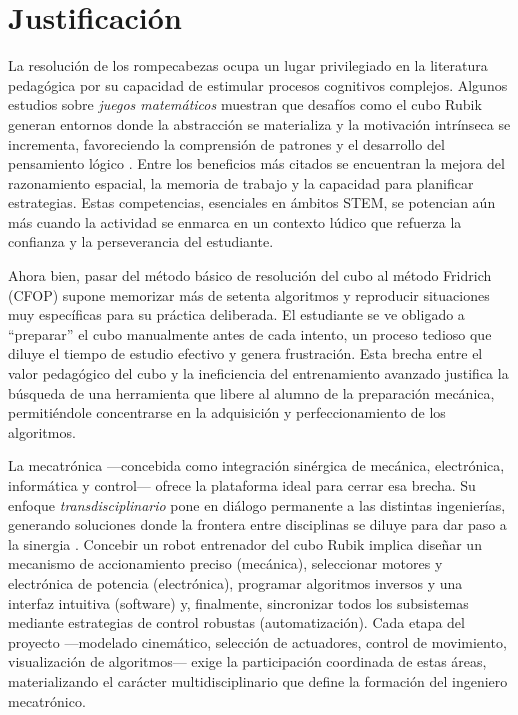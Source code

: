 \section{Justificación}
La resolución de los rompecabezas ocupa un lugar privilegiado en la literatura pedagógica por su capacidad de estimular procesos cognitivos complejos. Algunos estudios sobre \emph{juegos matemáticos} muestran que desafíos como el cubo Rubik generan entornos donde la abstracción se materializa y la motivación intrínseca se incrementa, favoreciendo la comprensión de patrones y el desarrollo del pensamiento lógico \cite{SilvaMera2024}. Entre los beneficios más citados se encuentran la mejora del razonamiento espacial, la memoria de trabajo y la capacidad para planificar estrategias. Estas competencias, esenciales en ámbitos STEM, se potencian aún más cuando la actividad se enmarca en un contexto lúdico que refuerza la confianza y la perseverancia del estudiante.

Ahora bien, pasar del método básico de resolución del cubo al método Fridrich (CFOP) supone memorizar más de setenta algoritmos y reproducir situaciones muy específicas para su práctica deliberada. El estudiante se ve obligado a “preparar” el cubo manualmente antes de cada intento, un proceso tedioso que diluye el tiempo de estudio efectivo y genera frustración. Esta brecha entre el valor pedagógico del cubo y la ineficiencia del entrenamiento avanzado justifica la búsqueda de una herramienta que libere al alumno de la preparación mecánica, permitiéndole concentrarse en la adquisición y perfeccionamiento de los algoritmos.

La mecatrónica —concebida como integración sinérgica de mecánica, electrónica, informática y control— ofrece la plataforma ideal para cerrar esa brecha. Su enfoque \emph{transdisciplinario} pone en diálogo permanente a las distintas ingenierías, generando soluciones donde la frontera entre disciplinas se diluye para dar paso a la sinergia \cite{AquinoRobles2019}.  Concebir un robot entrenador del cubo Rubik implica diseñar un mecanismo de accionamiento preciso (mecánica), seleccionar motores y electrónica de potencia (electrónica), programar algoritmos inversos y una interfaz intuitiva (software) y, finalmente, sincronizar todos los subsistemas mediante estrategias de control robustas (automatización). Cada etapa del proyecto —modelado cinemático, selección de actuadores, control de movimiento, visualización de algoritmos— exige la participación coordinada de estas áreas, materializando el carácter multidisciplinario que define la formación del ingeniero mecatrónico.

